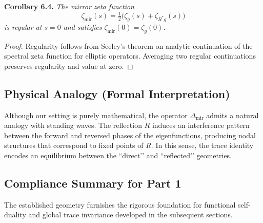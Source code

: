 \textbf{Corollary 6.4.}
\emph{The mirror zeta function}
\[
\zeta_{\mathrm{mir}}(s)
=\tfrac{1}{2}\big(\zeta_{g}(s)+\zeta_{R^{*}g}(s)\big)
\]
\emph{is regular at \(s=0\) and satisfies
\(\zeta_{\mathrm{mir}}(0)=\zeta_{g}(0)\).}

\begin{proof}
Regularity follows from Seeley’s theorem on analytic continuation
of the spectral zeta function for elliptic operators.
Averaging two regular continuations preserves regularity and value at zero.
\end{proof}

\subsection{Physical Analogy (Formal Interpretation)}\relax \hspace{0pt}

Although our setting is purely mathematical,
the operator \(\Delta_{\mathrm{mir}}\)
admits a natural analogy with standing waves.
The reflection \(R\) induces an interference pattern
between the forward and reversed phases of the eigenfunctions,
producing nodal structures that correspond to
fixed points of \(R\).
In this sense, the trace identity encodes
an equilibrium between the “direct’’ and “reflected’’ geometries.

\subsection{Compliance Summary for Part 1}\relax \hspace{0pt}


The established geometry furnishes the rigorous foundation
for functional self-duality and global trace invariance
developed in the subsequent sections.

